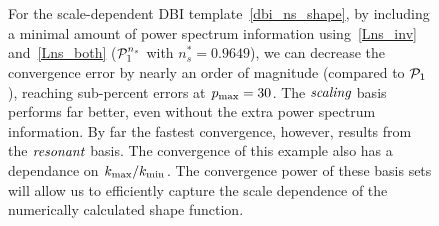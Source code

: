 \begin{figure}[!pth]
\centering
\\
\\
\caption{
    For the scale-dependent DBI template~\eqref{dbi_ns_shape},
    by including a minimal amount of power spectrum information
    using~\eqref{Lns_inv} and~\eqref{Lns_both} ($\mathcal{P}^{n_s}_1$ with
    $n_s^{*}=0.9649$), we can decrease the convergence error
    by nearly an order of magnitude (compared to $\mathcal{P}_1$), reaching sub-percent errors at $p_\text{max}=30$.
    The $\textit{scaling}$ basis performs far better, even without the extra
    power spectrum information.
    By far the fastest convergence, however, results from the $\textit{resonant}$ basis.
    The convergence of this example also has a dependance on ${k_\text{max}}/{k_\text{min}}$.
    The convergence power of these basis sets will allow us to efficiently
    capture the scale dependence of the numerically calculated shape function.
    }\label{fig:recon_dbi_ns}
\end{figure}

